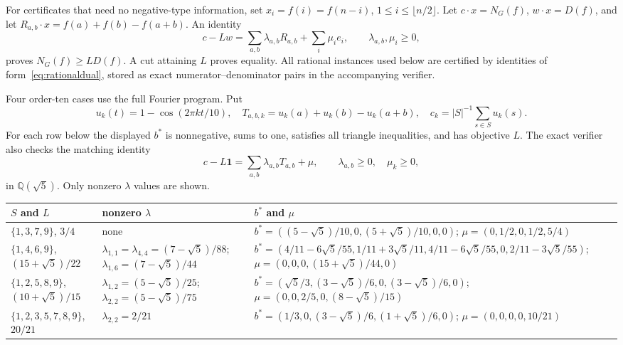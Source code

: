 \documentclass[11pt]{article}
\begin{document}
For certificates that need no negative-type information, set
$x_i=f(i)=f(n-i)$, $1\leq i\leq\lfloor n/2\rfloor$.  Let $c\cdot x=N_G(f)$,
$w\cdot x=D(f)$, and let $R_{a,b}\cdot x=f(a)+f(b)-f(a+b)$.  An identity
\begin{equation}\label{eq:rationaldual}
 c-Lw=\sum_{a,b}\lambda_{a,b}R_{a,b}+\sum_i\mu_i e_i,
 \qquad \lambda_{a,b},\mu_i\geq0,
\end{equation}
proves $N_G(f)\geq L D(f)$.  A cut attaining $L$ proves equality.  All
rational instances used below are certified by identities of
form~\eqref{eq:rationaldual}, stored as exact numerator--denominator pairs in
the accompanying verifier.

Four order-ten cases use the full Fourier program.  Put
\[
 u_k(t)=1-\cos(2\pi kt/10),\quad
 T_{a,b,k}=u_k(a)+u_k(b)-u_k(a+b),\quad
 c_k=|S|^{-1}\sum_{s\in S}u_k(s).
\]
For each row below the displayed $b^*$ is nonnegative, sums to one, satisfies
all triangle inequalities, and has objective $L$.  The exact verifier also
checks the matching identity
\begin{equation}\label{eq:quadraticdual}
 c-L\mathbf1=\sum_{a,b}\lambda_{a,b}T_{a,b}+\mu,
 \qquad \lambda_{a,b}\geq0,\quad \mu_k\geq0,
\end{equation}
in $\mathbb Q(\sqrt5)$.  Only nonzero $\lambda$ values are shown.

\begin{center}\small
\begin{tabular}{p{}p{}p{}}
\toprule
$S$ and $L$ & nonzero $\lambda$ & $b^*$ and $\mu$\\
\midrule
$\{1,3,7,9\}$, $3/4$
& none
& $b^*=((5-\sqrt5)/10,0,(5+\sqrt5)/10,0,0)$;
  $\mu=(0,1/2,0,1/2,5/4)$\\[2pt]
$\{1,4,6,9\}$, $(15+\sqrt5)/22$
& $\lambda_{1,1}=\lambda_{4,4}=(7-\sqrt5)/88$;
  $\lambda_{1,6}=(7-\sqrt5)/44$
& $b^*=(4/11-6\sqrt5/55,1/11+3\sqrt5/11,
4/11-6\sqrt5/55,0,2/11-3\sqrt5/55)$;
$\mu=(0,0,0,(15+\sqrt5)/44,0)$\\[2pt]
$\{1,2,5,8,9\}$, $(10+\sqrt5)/15$
& $\lambda_{1,2}=(5-\sqrt5)/25$;
  $\lambda_{2,2}=(5-\sqrt5)/75$
& $b^*=(\sqrt5/3,(3-\sqrt5)/6,0,(3-\sqrt5)/6,0)$;
$\mu=(0,0,2/5,0,(8-\sqrt5)/15)$\\[2pt]
$\{1,2,3,5,7,8,9\}$, $20/21$
& $\lambda_{2,2}=2/21$
& $b^*=(1/3,0,(3-\sqrt5)/6,(1+\sqrt5)/6,0)$;
$\mu=(0,0,0,0,10/21)$\\
\bottomrule
\end{tabular}
\end{center}
\end{document}

